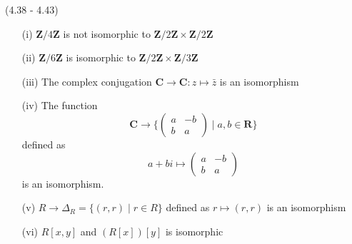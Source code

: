 \begin{ex}
 (4.38 - 4.43)
\begin{itemize}
	\item[(i)] ${\bm Z}/4{\bm Z}$ is not isomorphic to ${\bm Z}/2{\bm Z}\times {\bm Z}/2{\bm Z}$
	\item[(ii)] ${\bm Z}/6{\bm Z}$ is isomorphic to ${\bm Z}/2{\bm Z}\times {\bm Z}/3{\bm Z}$
	\item[(iii)] The complex conjugation ${\bm C}\rightarrow {\bm C}:z\mapsto \bar{z}$ is an isomorphism
	\item[(iv)] The function
	\[{\bm C}\rightarrow \Big\{\begin{pmatrix}
		a&-b\\b&a
	\end{pmatrix}
	\;\Big|\;a,b\in {\bm R}\Big\}\]
	defined as
	\[a+bi\mapsto \begin{pmatrix}
		a&-b\\b&a
	\end{pmatrix}
	\]
	is an isomorphism. 
\item[(v)] $R\rightarrow \Delta _{R}=\{(r,r) \;|\; r\in R\}$ defined as $r\mapsto (r,r)$ is an isomorphism
\item[(vi)] $R[x,y]$ and $(R[x])[y]$ is isomorphic
\end{itemize}
\end{ex}
\vspace{2ex}

